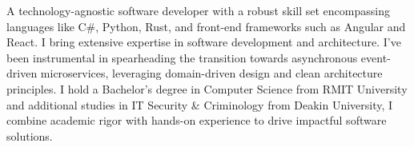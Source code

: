
\par{
A technology-agnostic software developer with a robust skill set encompassing languages like C\#, Python, Rust, and front-end frameworks such as Angular and React. I bring extensive expertise in software development and architecture. I've been instrumental in spearheading the transition towards asynchronous event-driven microservices, leveraging domain-driven design and clean architecture principles. I hold a Bachelor's degree in Computer Science from RMIT University and additional studies in IT Security \& Criminology from Deakin University, I combine academic rigor with hands-on experience to drive impactful software solutions.
}